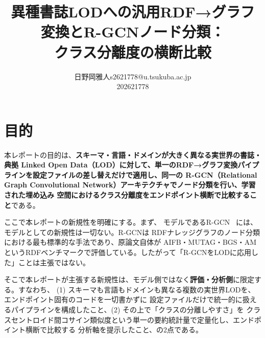 \documentclass[dvipdfmx,twoside,11pt]{article}
\makeatletter
\newcommand\studentName{日野岡雅人}                  %
\newcommand\studentEmail{s2621778@u.tsukuba.ac.jp}          %
\newcommand\studentNumber{202621778}                %
\newcommand{\repourl}{\href{https://github.com/terasaki-8910/MLPR_final_report.git}{{\ttfamily\scriptsize https://github.com/terasaki-8910/MLPR\_final\_report.git}}}
\makeatother
\begin{document}
    \title{異種書誌LODへの汎用RDF→グラフ変換とR-GCNノード分類：\\クラス分離度の横断比較}

    \author{\name \studentName \email \studentEmail \\
    \studentNumber
    \addr
    }


    \maketitle

\makeatletter
\def\@oddfoot{{\repourl}\hfil{\rm\thepage}}%
\def\@evenfoot{{\rm\thepage}\hfil{\repourl}}%
\makeatother

\section{目的}
\label{sec:purpose}

本レポートの目的は、\textbf{スキーマ・言語・ドメインが大きく異なる実世界の書誌・典拠 Linked Open
Data（LOD）に対して、単一のRDF→グラフ変換パイプラインを設定ファイルの差し替えだけで適用し、同一の
R-GCN（Relational Graph Convolutional Network）アーキテクチャでノード分類を行い、学習された埋め込み
空間におけるクラス分離度をエンドポイント横断で比較すること}である。

ここで本レポートの新規性を明確にする。まず、
モデルであるR-GCN~\citep{schlichtkrull2018modeling} には、モデルとしての新規性は一切ない。R-GCNは
RDFナレッジグラフのノード分類における最も標準的な手法であり、原論文自体が AIFB・MUTAG・BGS・AM
というRDFベンチマークで評価している。したがって「R-GCNをLODに応用した」ことは主張ではない。

そこで本レポートが主張する新規性は、モデル側ではなく\textbf{評価・分析側}に限定する。すなわち、
(1) スキーマも言語もドメインも異なる複数の実世界LODを、エンドポイント固有のコードを一切書かずに
設定ファイルだけで統一的に扱えるパイプラインを構成したこと、(2) その上で「クラスの分離しやすさ」を
クラスセントロイド間コサイン類似度という単一の要約統計量で定量化し、エンドポイント横断で比較する
分析軸を提示したこと、の2点である。
\end{document}
